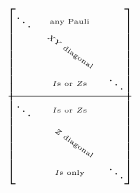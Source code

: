 \documentclass[]{standalone}
\begin{document}
$\begin{aligned} 
  \begin{bmatrix}
    \ddots & ^{\scriptscriptstyle \text{any Pauli}} &  \\
    & {\rotatebox[origin=c]{-35}{$\scriptscriptstyle XY\text{ diagonal}$}} & \\
    & ^{\scriptscriptstyle I\text{s or }Z\text{s}} & \ddots \\
    \hline
    \ddots & ^{\scriptscriptstyle I\text{s or }Z\text{s}} & \\
    & {\rotatebox[origin=c]{-35}{$\scriptscriptstyle \ \ Z\text{ diagonal}$}} & \\
    & ^{\scriptscriptstyle I\text{s only}} & \ddots
  \end{bmatrix}
\end{aligned}$ 
\end{document}
